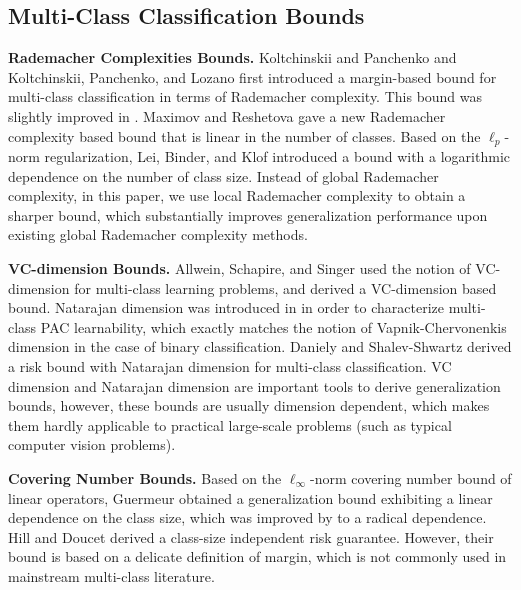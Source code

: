 \documentclass{article}
\begin{document}
\subsection{Multi-Class Classification Bounds}
\textbf{Rademacher Complexities Bounds.}
   Koltchinskii and Panchenko \cite{koltchinskii2002empirical}
    and Koltchinskii, Panchenko, and Lozano \cite{koltchinskii2001some}
    first introduced a margin-based bound for multi-class classification in terms of Rademacher complexity.
    This bound was slightly improved in \cite{mohri2012foundations,cortes2013multi}.
    Maximov and Reshetova \cite{maximov2016tight} gave a new Rademacher complexity based bound
    that is linear in the number of classes.
    Based on the $\ell_p$-norm regularization,
    Lei, Binder, and Klof \cite{lei2015multi} introduced a bound
    with a logarithmic dependence on the number of class size.
    Instead of global Rademacher complexity,
    in this paper, we use local Rademacher complexity
    to obtain a sharper bound, which  substantially improves
    generalization performance upon existing global Rademacher complexity methods.

\textbf{VC-dimension Bounds.}
    Allwein, Schapire, and Singer \cite{allwein2000reducing}  used the notion of VC-dimension
    for multi-class learning problems,
    and derived a VC-dimension based bound.
    Natarajan dimension was introduced in \cite{Natarajan1989} in
    order to characterize multi-class PAC learnability,
    which exactly matches the notion of Vapnik-Chervonenkis
    dimension in the case of binary classification.
    Daniely and Shalev-Shwartz \cite{daniely2014optimal} derived a risk bound with Natarajan dimension for multi-class classification.
    VC dimension and Natarajan dimension are important tools to derive generalization bounds,
    however, these bounds are usually dimension
    dependent, which makes them hardly applicable to practical large-scale problems (such as typical computer vision problems).

\textbf{Covering Number  Bounds.}
    Based on the $\ell_\infty$-norm covering number bound of
    linear operators, Guermeur \cite{guermeur2002combining} obtained
    a generalization bound exhibiting a linear dependence on the class size,
    which was improved by \cite{zhang2004statistical} to a radical dependence.
    Hill and Doucet \cite{Hill2007} derived a class-size independent risk guarantee.
    However, their bound is based on a delicate definition of margin,
    which is not commonly used in mainstream multi-class literature.
\end{document}
